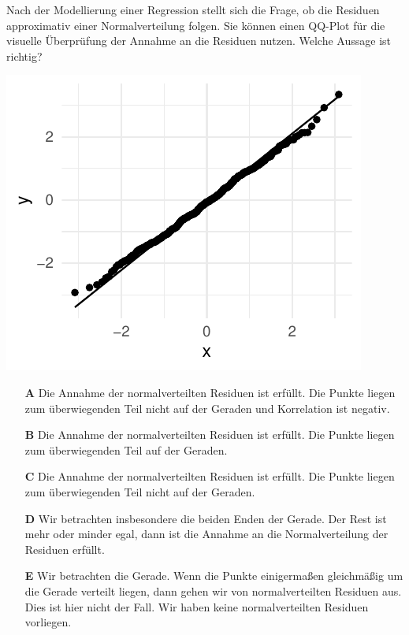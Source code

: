 \documentclass[a4paper, 9pt]{scrartcl}\usepackage[]{graphicx}\usepackage[]{xcolor}
\makeatletter
\def\maxwidth{ %
  \ifdim\Gin@nat@width>\linewidth
    \linewidth
  \else
    \Gin@nat@width
  \fi
}
\makeatother
\begin{document}
Nach der Modellierung einer Regression stellt sich die Frage, ob die Residuen approximativ einer Normalverteilung folgen. Sie können einen QQ-Plot für die visuelle Überprüfung der Annahme an die Residuen nutzen. Welche Aussage ist richtig?



{\centering \includegraphics[width=\maxwidth]{img/mc-regression-05-a-1} 

}







\begin{enumerate}
\item [\textbf{A} \msquare] Die Annahme der normalverteilten Residuen ist erfüllt. Die Punkte liegen zum überwiegenden Teil nicht auf der Geraden und Korrelation ist negativ.
\item [\textbf{B} \msquare] Die Annahme der normalverteilten Residuen ist erfüllt. Die Punkte liegen zum überwiegenden Teil auf der Geraden.
\item [\textbf{C} \msquare] Die Annahme der normalverteilten Residuen ist erfüllt. Die Punkte liegen zum überwiegenden Teil nicht auf der Geraden.
\item [\textbf{D} \msquare] Wir betrachten insbesondere die beiden Enden der Gerade. Der Rest ist mehr oder minder egal, dann ist die Annahme an die Normalverteilung der Residuen erfüllt.
\item [\textbf{E} \msquare] Wir betrachten die Gerade. Wenn die Punkte einigermaßen gleichmäßig um die Gerade verteilt liegen, dann gehen wir von normalverteilten Residuen aus. Dies ist hier nicht der Fall. Wir haben keine normalverteilten Residuen vorliegen.
\end{enumerate}
\end{document}

